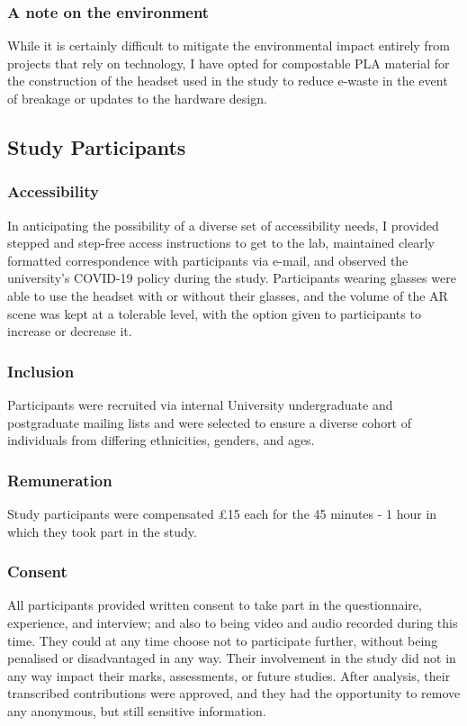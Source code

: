 \subsubsection{A note on the environment}\label{sec: polaris-ethics-environment}
While it is certainly difficult to mitigate the environmental impact entirely from projects that rely on technology, I have opted for compostable PLA material for the construction of the headset used in the study to reduce e-waste in the event of breakage or updates to the hardware design.

\subsection{Study Participants}\label{sec: polaris-ethics-participants}
\subsubsection{Accessibility}\label{sec: polaris-ethics-accessibility}
In anticipating the possibility of a diverse set of accessibility needs, I provided stepped and step-free access instructions to get to the lab, maintained clearly formatted correspondence with participants via e-mail, and observed the university’s COVID-19 policy during the study. Participants wearing glasses were able to use the headset with or without their glasses, and the volume of the AR scene was kept at a tolerable level, with the option given to participants to increase or decrease it.

\subsubsection{Inclusion}\label{sec: polaris-ethics-inclusion}
Participants were recruited via internal University undergraduate and postgraduate mailing lists and were selected to ensure a diverse cohort of individuals from differing ethnicities, genders, and ages.

\subsubsection{Remuneration}\label{sec: polaris-ethics-renumeration}
Study participants were compensated £15 each for the 45 minutes - 1 hour in which they took part in the study.

\subsubsection{Consent}\label{sec: polaris-ethics-consent}
All participants provided written consent to take part in the questionnaire, experience, and interview; and also to being video and audio recorded during this time. They could at any time choose not to participate further, without being penalised or disadvantaged in any way. Their involvement in the study did not in any way impact their marks, assessments, or future studies. After analysis, their transcribed contributions were approved, and they had the opportunity to remove any anonymous, but still sensitive information.

